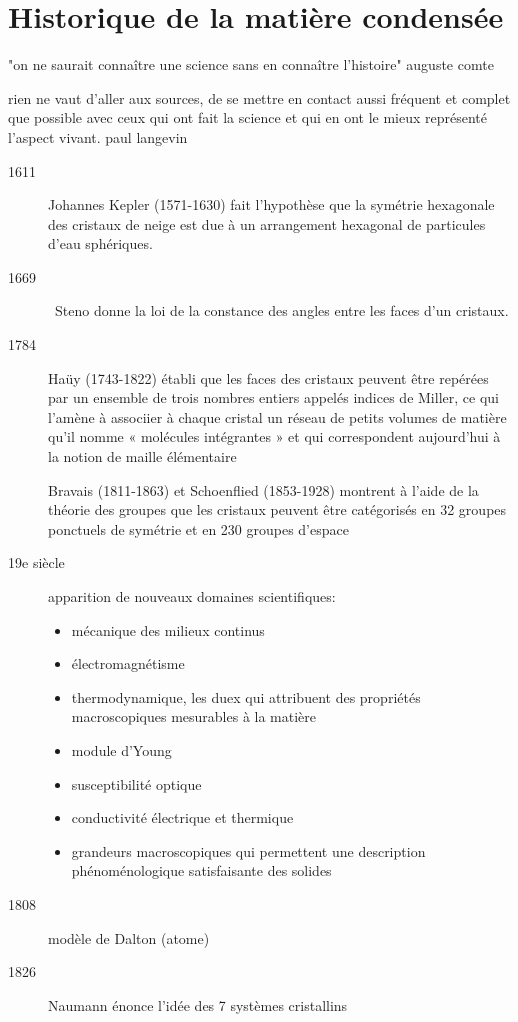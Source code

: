 \chapter{Historique de la matière condensée}

"on ne saurait connaître une science sans en connaître l'histoire" auguste comte


rien ne vaut d'aller aux sources, de se mettre en contact aussi fréquent et complet que possible avec ceux qui ont fait la science et qui en ont le mieux représenté l'aspect vivant. paul langevin
\begin{description}
\item[1611] Johannes Kepler (1571-1630) fait l'hypothèse que la symétrie hexagonale des cristaux de neige est due à un arrangement hexagonal de particules d'eau sphériques.
\item[1669] Steno donne la loi de la constance des angles entre les faces d'un cristaux.
\item[1784] Haüy (1743-1822) établi que les faces des cristaux peuvent être repérées par un ensemble de trois nombres entiers appelés indices de Miller, ce qui l'amène à associier à chaque cristal un réseau de petits volumes de matière qu'il nomme « molécules intégrantes » et qui correspondent aujourd'hui à la notion de maille élémentaire
\item[ ] Bravais (1811-1863) et Schoenflied (1853-1928) montrent à l'aide de la théorie des groupes que les cristaux peuvent être catégorisés en 32 groupes ponctuels de symétrie et en 230 groupes d'espace
\item[19e siècle] apparition de nouveaux domaines scientifiques:
    \begin{itemize}
    \item mécanique des milieux continus
    \item électromagnétisme
    \item thermodynamique, les duex qui attribuent des propriétés macroscopiques mesurables à la matière
    \item module d'Young
    \item susceptibilité optique
    \item conductivité électrique et thermique
    \item grandeurs macroscopiques qui permettent une description phénoménologique satisfaisante des solides
    \end{itemize}
\item[1808]  modèle de Dalton (atome)
\item[1826] Naumann énonce l'idée des 7 systèmes cristallins

\end{description}
